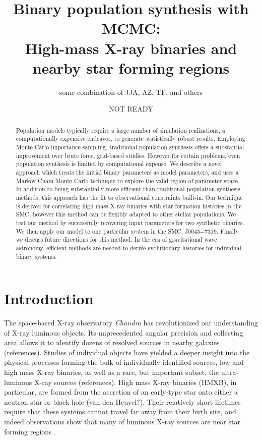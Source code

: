 \documentclass[12pt, preprint]{aastex}
\begin{document}
\title{Binary population synthesis with MCMC: \\ High-mass X-ray binaries and nearby star forming regions}
\author{some combination of JJA, AZ, TF, and others}
\date{NOT READY}

\begin{abstract}
Population models typically require a large number of simulation realizations, a computationally expensive endeavor, to generate statistically robust results. Employing Monte Carlo importance sampling, traditional population synthesis offers a substantial improvement over brute force, grid-based studies. However for certain problems, even population synthesis is limited by computational expense. We describe a novel approach which treats the initial binary parameters as model parameters, and uses a Markov Chain Monte Carlo technique to explore the valid region of parameter space. In addition to being substantially more efficient than traditional population synthesis methods, this approach has the fit to observational constraints built-in. Our technique is derived for correlating high mass X-ray binaries with star formation histories in the SMC, however this method can be flexibly adapted to other stellar populations. We test our method by successfully recovering input parameters for two synthetic binaries. We then apply our model to one particular system in the SMC, J0045$-$7319. Finally, we discuss future directions for this method. In the era of gravitational wave astronomy, efficient methods are needed to derive evolutionary histories for individual binary systems.
\end{abstract}





\section{Introduction}


The space-based X-ray observatory {\it Chandra} has revolutionized our understanding of X-ray luminous objects. Its unprecedented angular precision and collecting area allows it to identify dozens of resolved sources in nearby galaxies (references). Studies of individual objects have yielded a deeper insight into the physical processes forming the bulk of individually identified sources, low and high mass X-ray binaries, as well as a rare, but important subset, the ultra-luminous X-ray sources (references). High mass X-ray binaries (HMXB), in particular, are formed from the accretion of an early-type star onto either a neutron star or black hole (van den Heuvel?). Their relatively short lifetimes require that these systems cannot travel far away from their birth site, and indeed observations show that many of luminous X-ray sources are near star forming regions \citep{zezas02, kaaret04}. 
\end{document}
